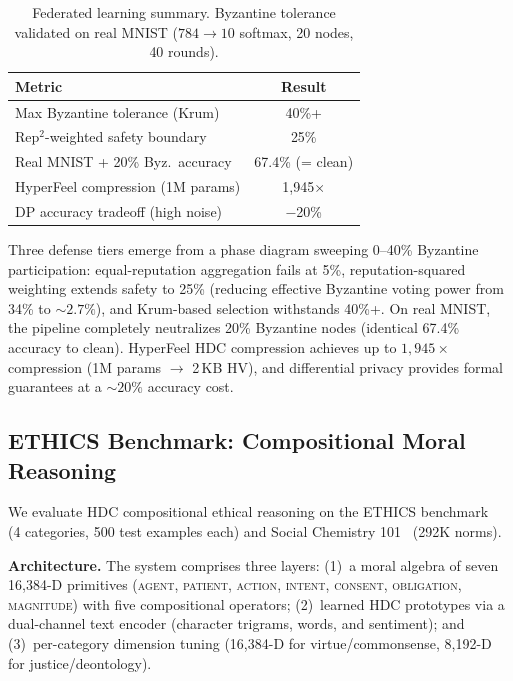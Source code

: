 \documentclass[10pt,letterpaper]{article}
\begin{document}
\begin{table}[ht]
\centering
\caption{Federated learning summary. Byzantine tolerance validated on real MNIST ($784 \to 10$ softmax, 20 nodes, 40 rounds).}
\label{tab:fl-summary}
\small
\begin{tabular}{@{}lc@{}}
\toprule
Metric & Result \\
\midrule
Max Byzantine tolerance (Krum) & 40\%+ \\
Rep$^2$-weighted safety boundary & 25\% \\
Real MNIST + 20\% Byz.\ accuracy & 67.4\% (= clean) \\
HyperFeel compression (1M params) & 1,945$\times$ \\
DP accuracy tradeoff (high noise) & $-$20\% \\
\bottomrule
\end{tabular}
\end{table}

Three defense tiers emerge from a phase diagram sweeping 0--40\% Byzantine participation: equal-reputation aggregation fails at 5\%, reputation-squared weighting extends safety to 25\% (reducing effective Byzantine voting power from 34\% to ${\sim}2.7\%$), and Krum-based selection withstands 40\%+. On real MNIST, the pipeline completely neutralizes 20\% Byzantine nodes (identical 67.4\% accuracy to clean). HyperFeel HDC compression achieves up to $1{,}945{\times}$ compression (1M params $\to$ 2\,KB HV), and differential privacy provides formal guarantees at a ${\sim}20\%$ accuracy cost.

\subsection{ETHICS Benchmark: Compositional Moral Reasoning}
\label{sec:ethics}

We evaluate HDC compositional ethical reasoning on the ETHICS benchmark~\cite{hendrycks2021aligning} (4 categories, 500 test examples each) and Social Chemistry 101~\cite{forbes2020social} (292K norms).

\textbf{Architecture.} The system comprises three layers: (1)~a moral algebra of seven 16,384-D primitives (\textsc{agent}, \textsc{patient}, \textsc{action}, \textsc{intent}, \textsc{consent}, \textsc{obligation}, \textsc{magnitude}) with five compositional operators; (2)~learned HDC prototypes via a dual-channel text encoder (character trigrams, words, and sentiment); and (3)~per-category dimension tuning (16,384-D for virtue/commonsense, 8,192-D for justice/deontology).
\end{document}
